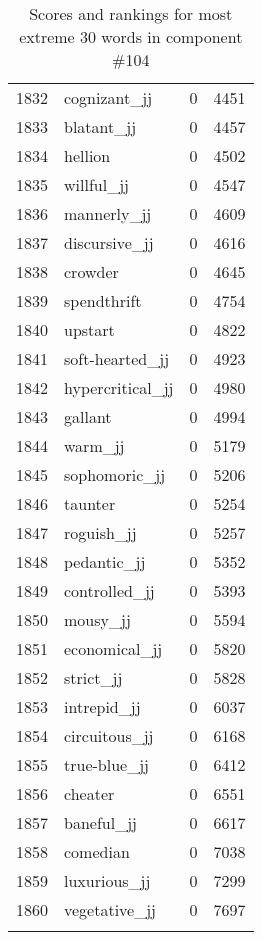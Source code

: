 \begin{longtable}[!htbp]{| rlr@{.}l |}
    1832 & cognizant\_jj & 0 & 4451 \\
    1833 & blatant\_jj & 0 & 4457 \\
    1834 & hellion & 0 & 4502 \\
    1835 & willful\_jj & 0 & 4547 \\
    1836 & mannerly\_jj & 0 & 4609 \\
    1837 & discursive\_jj & 0 & 4616 \\
    1838 & crowder & 0 & 4645 \\
    1839 & spendthrift & 0 & 4754 \\
    1840 & upstart & 0 & 4822 \\
    1841 & soft-hearted\_jj & 0 & 4923 \\
    1842 & hypercritical\_jj & 0 & 4980 \\
    1843 & gallant & 0 & 4994 \\
    1844 & warm\_jj & 0 & 5179 \\
    1845 & sophomoric\_jj & 0 & 5206 \\
    1846 & taunter & 0 & 5254 \\
    1847 & roguish\_jj & 0 & 5257 \\
    1848 & pedantic\_jj & 0 & 5352 \\
    1849 & controlled\_jj & 0 & 5393 \\
    1850 & mousy\_jj & 0 & 5594 \\
    1851 & economical\_jj & 0 & 5820 \\
    1852 & strict\_jj & 0 & 5828 \\
    1853 & intrepid\_jj & 0 & 6037 \\
    1854 & circuitous\_jj & 0 & 6168 \\
    1855 & true-blue\_jj & 0 & 6412 \\
    1856 & cheater & 0 & 6551 \\
    1857 & baneful\_jj & 0 & 6617 \\
    1858 & comedian & 0 & 7038 \\
    1859 & luxurious\_jj & 0 & 7299 \\
    1860 & vegetative\_jj & 0 & 7697 \\
    \hline
    \caption{Scores and rankings for most extreme 30 words in component \#104} \\
\end{longtable}
